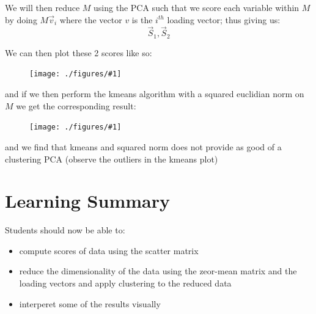 \documentclass[12pt]{book}
\newcommand{\incimg}[2]{%
       \begin{figure}[h]
               \centering
               \texttt{[image: ./figures/\#1]}
       \end{figure}
}
\begin{document}
We will then reduce $M$ using the PCA such that we score each variable within 
$M$ by doing $M\vec v_i$ where the vector $v$ is the $i^{th}$ loading vector; 
thus giving us:
\[\vec S_1, \vec S_2\]

We can then plot these 2 scores like so:
\incimg{PCAscore}{0.5}

and if we then perform the kmeans algorithm with a squared euclidian norm 
 on $M$ we get the corresponding
result:
\incimg{kmeansScore}{0.5}

and we find that kmeans and squared norm does not provide as good of a clustering
PCA (observe the outliers in the kmeans plot)

\section*{Learning Summary}
Students should now be able to:
\begin{itemize}
        \item compute scores of data using the scatter matrix
        \item reduce the dimensionality of the data using the zeor-mean matrix 
                and the loading vectors and apply clustering to the reduced data
        \item interperet some of the results visually
\end{itemize}
\end{document}
